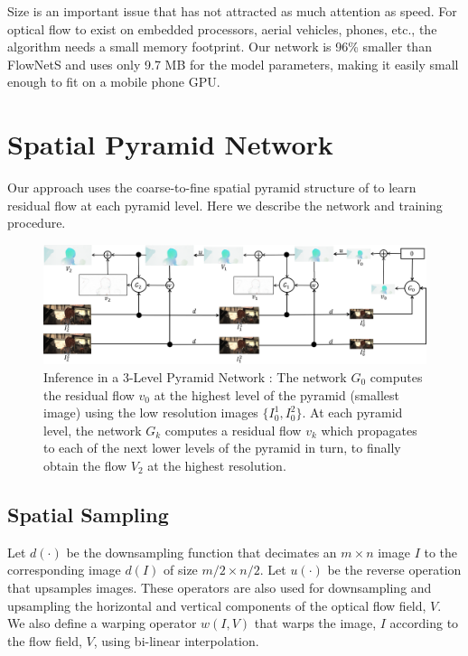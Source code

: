 \documentclass[10pt,twocolumn,letterpaper]{article}
\begin{document}
Size is an important issue that has not attracted as much attention as speed.
For optical flow to exist on embedded processors, aerial vehicles, phones, etc., the algorithm needs a small memory footprint.
Our network is 96\% smaller than FlowNetS and uses only 9.7 MB for the model parameters, making it easily small enough to fit on a mobile phone GPU.


\section{Spatial Pyramid Network}   
Our approach uses the coarse-to-fine spatial pyramid structure of \cite{denton2015deep} to learn residual flow at each pyramid level. 
Here we describe the network and training procedure. %

\begin{figure}
\centerline{
\includegraphics[width=\linewidth]{Infer2.png}
}
\caption{Inference in a 3-Level Pyramid Network \cite{denton2015deep}: The network $G_0$ computes the residual flow $v_0$ at the highest level of the pyramid (smallest image) using the low resolution images $\{I_0^1, I_0^2\}$. At each pyramid level, the network $G_k$ computes a residual flow $v_k$ which propagates to each of the next lower levels of the pyramid in turn, to finally obtain the flow $V_2$ at the highest resolution.}
\label{fig:infer}
\end{figure}

\subsection{Spatial Sampling}
Let $d(\cdot)$ be the downsampling function that decimates an $m \times n$ image $I$ to the corresponding image $d(I)$ of size $m/2 \times n/2$. Let $u(\cdot)$ be the reverse operation that upsamples images. These operators are also used for downsampling and upsampling the horizontal and vertical components of the optical flow field, $V$. 
We also define a warping operator $w(I,V)$ that warps the image, $I$ according to the flow field, $V$, using  bi-linear interpolation.
\end{document}
